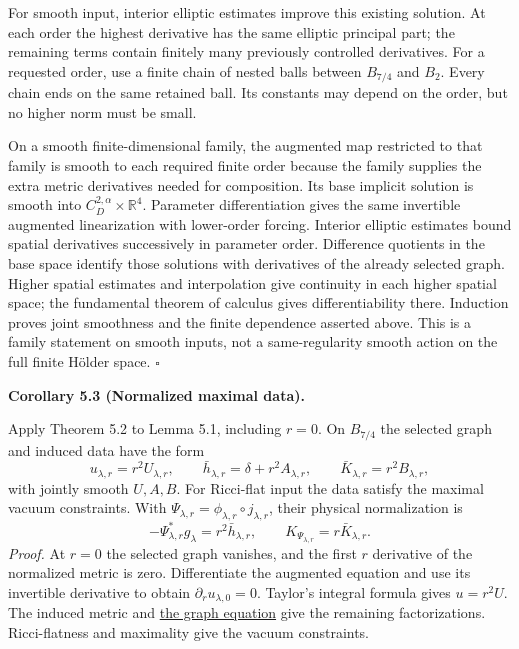 \documentclass[
  english,
  11pt,
  reqno]{amsart}
\makeatletter
\newcommand{\pandocstatementheading}[1]{%
  \par\if@nobreak\else
    \addpenalty{\@beginparpenalty}%
    \addvspace{.5\baselineskip plus .2\baselineskip minus .2\baselineskip}%
  \fi
  {\normalfont\bfseries #1\par}%
  \nobreak\@afterindenttrue\@afterheading
}
\makeatother
\begin{document}
For smooth input, interior elliptic estimates improve this existing
solution. At each order the highest derivative has the same elliptic
principal part; the remaining terms contain finitely many previously
controlled derivatives. For a requested order, use a finite chain of
nested balls between \(B_{7/4}\) and \(B_2\). Every chain ends on the
same retained ball. Its constants may depend on the order, but no higher
norm must be small.

On a smooth finite-dimensional family, the augmented map restricted to
that family is smooth to each required finite order because the family
supplies the extra metric derivatives needed for composition. Its base
implicit solution is smooth into \(C_D^{2,\alpha}\times\mathbb R^4\).
Parameter differentiation gives the same invertible augmented
linearization with lower-order forcing. Interior elliptic estimates
bound spatial derivatives successively in parameter order. Difference
quotients in the base space identify those solutions with derivatives of
the already selected graph. Higher spatial estimates and interpolation
give continuity in each higher spatial space; the fundamental theorem of
calculus gives differentiability there. Induction proves joint
smoothness and the finite dependence asserted above. This is a family
statement on smooth inputs, not a same-regularity smooth action on the
full finite Hölder space. \hfill\(\square\)

\pandocstatementheading{\leavevmode{}\label{cor:submission-normalized-maximal-data}Corollary 5.3 (Normalized maximal data).}

Apply Theorem 5.2 to Lemma 5.1, including \(r=0\). On \(B_{7/4}\) the
selected graph and induced data have the form%
 \[
u_{\lambda,r}=r^2U_{\lambda,r},
\qquad
\bar h_{\lambda,r}=\delta+r^2A_{\lambda,r},
\qquad
\bar K_{\lambda,r}=r^2B_{\lambda,r},
\] with jointly smooth \(U,A,B\). For Ricci-flat input the data satisfy
the maximal vacuum constraints. With
\(\Psi_{\lambda,r}=\phi_{\lambda,r}\circ j_{\lambda,r}\), their physical
normalization is%
 \[
-\Psi_{\lambda,r}^*g_\lambda=r^2\bar h_{\lambda,r},
\qquad
K_{\Psi_{\lambda,r}}=r\bar K_{\lambda,r}.
\] \emph{Proof.} At \(r=0\) the selected graph vanishes, and the first
\(r\) derivative of the normalized metric is zero. Differentiate the
augmented equation and use its invertible derivative to obtain
\(\partial_ru_{\lambda,0}=0\). Taylor's integral formula gives
\(u=r^2U\). The induced metric and
\hyperref[eq:submission-maximal-graph-equation]{the graph equation} give
the remaining factorizations. Ricci-flatness and maximality give the
vacuum constraints.
\end{document}
